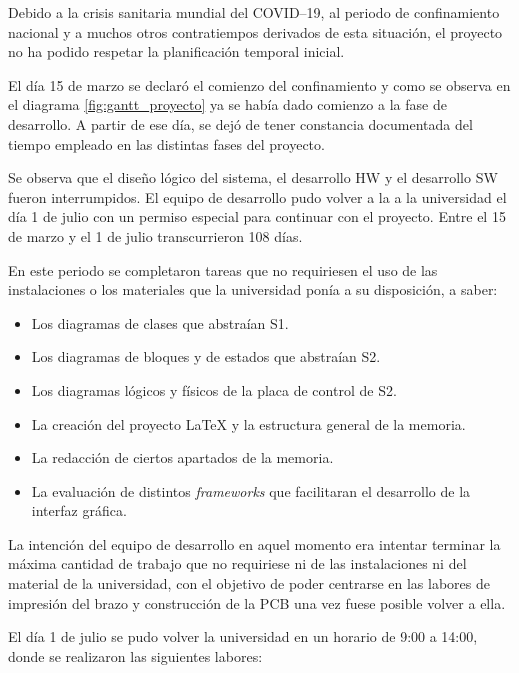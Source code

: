 Debido a la crisis sanitaria mundial del COVID--19, al periodo de confinamiento nacional y a muchos otros contratiempos derivados de esta situación, el proyecto no ha podido respetar la planificación temporal inicial.

El día 15 de marzo se declaró el comienzo del confinamiento y como se observa en el diagrama \ref{fig:gantt_proyecto} ya se había dado comienzo a la fase de desarrollo. A partir de ese día, se dejó de tener constancia documentada del tiempo empleado en las distintas fases del proyecto.

Se observa que el diseño lógico del sistema, el desarrollo \ac{HW} y el desarrollo \ac{SW} fueron interrumpidos. El equipo de desarrollo pudo volver a la a la universidad el día 1 de julio con un permiso especial para continuar con el proyecto. Entre el 15 de marzo y el 1 de julio transcurrieron 108 días.

En este periodo se completaron tareas que no requiriesen el uso de las instalaciones o los materiales que la universidad ponía a su disposición, a saber:

\begin{itemize}
    \item Los diagramas de clases que abstraían \ac{S1}.
    \item Los diagramas de bloques y de estados que abstraían \ac{S2}.
    \item Los diagramas lógicos y físicos de la placa de control de \ac{S2}.
    \item La creación del proyecto \LaTeX{} y la estructura general de la memoria.
    \item La redacción de ciertos apartados de la memoria.
    \item La evaluación de distintos \textit{frameworks} que facilitaran el desarrollo de la interfaz gráfica.
\end{itemize}

La intención del equipo de desarrollo en aquel momento era intentar terminar la máxima cantidad de trabajo que no requiriese ni de las instalaciones ni del material de la universidad, con el objetivo de poder centrarse en las labores de impresión del brazo y construcción de la PCB una vez fuese posible volver a ella.

El día 1 de julio se pudo volver la universidad en un horario de 9:00 a 14:00, donde
se realizaron las siguientes labores:

